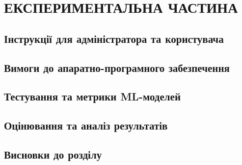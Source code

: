 \chapter{ЕКСПЕРИМЕНТАЛЬНА ЧАСТИНА}

\section{Інструкції для адміністратора та користувача}
\section{Вимоги до апаратно-програмного забезпечення}
\section{Тестування та метрики ML-моделей}
\section{Оцінювання та аналіз результатів}
\section{Висновки до розділу}
